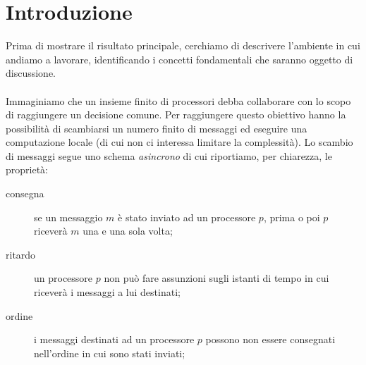 \documentclass{article}
\begin{document}
\title{\rmfamily\normalfont{}}
\author{\\
	\\
	}
\date{} %

\maketitle


\begin{abstract}
  In questo lavoro ci proponiamo di studiare il risultato di
  impossilit\`a del consenso in un sistema totalmente asincrono,
  dimostrato da Fischer, Lynch e Paterson nel 1985.

  Nella nostra esposizione intendiamo riportare i principali risultati
  raggiunti dagli autori, integrando alcuni dettagli con brevi
  interventi che abbiamo sviluppato durante lo studio.

  Questo nostro elaborato \`e diviso in due macro sezioni: la prima ha
  un taglio pi\`u teorico e tratta la prova d'impossibilit\`a; la
  seconda, invece, ha un taglio pi\`u implementativo e propone uno
  schema per risolvere il problema del consenso, aggiungendo alcune
  ipotesi.
\end{abstract}
       
\tableofcontents

\section{Introduzione}
\label{sec:intro}
Prima di mostrare il risultato principale, cerchiamo di descrivere
l'ambiente in cui andiamo a lavorare, identificando i concetti
fondamentali che saranno oggetto di discussione.\\\\

Immaginiamo che un insieme finito di processori debba collaborare con
lo scopo di raggiungere un decisione comune. Per raggiungere questo
obiettivo hanno la possibilit\`a di scambiarsi un numero finito di
messaggi ed eseguire una computazione locale (di cui non ci interessa
limitare la complessit\`a). Lo scambio di messaggi segue uno schema
\emph{asincrono} di cui riportiamo, per chiarezza, le propriet\`a:
\begin{description}
\item[consegna] se un messaggio $m$ \`e stato inviato ad un processore
  $p$, prima o poi $p$ ricever\`a $m$ una e una sola volta;
\item[ritardo] un processore $p$ non pu\`o fare assunzioni sugli
  istanti di tempo in cui ricever\`a i messaggi a lui destinati;
\item[ordine] i messaggi destinati ad un processore $p$ possono non
  essere consegnati nell'ordine in cui sono stati inviati;
\end{description}
\end{document}
